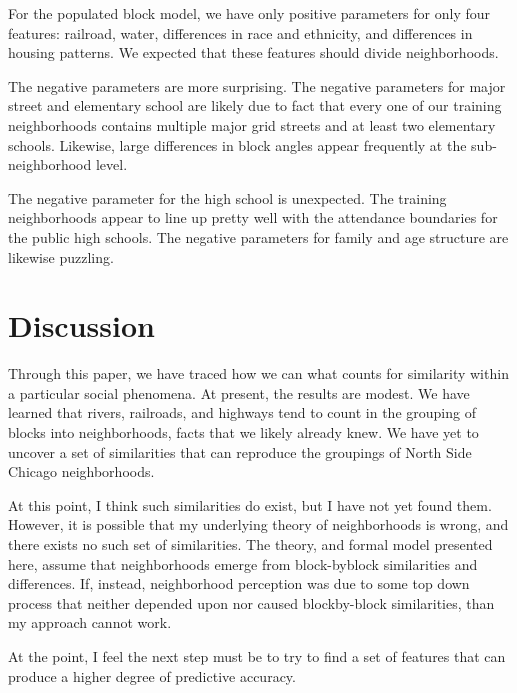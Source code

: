 \documentclass[12pt,letter]{article}\usepackage[]{graphicx}\usepackage[]{color}
\begin{document}
For the populated block model, we have only
positive parameters for only four features: railroad, water,
differences in race and ethnicity, and differences in housing
patterns. We expected that these features should divide neighborhoods.

The negative parameters are more surprising. The negative parameters
for major street and elementary school are likely due to fact that
every one of our training neighborhoods contains multiple major grid
streets and at least two elementary schools. Likewise, large
differences in block angles appear frequently at the sub-neighborhood
level.  

The negative parameter for the high school is unexpected. The
training neighborhoods appear to line up pretty well with the
attendance boundaries for the public high schools. The negative
parameters for family and age structure are likewise puzzling.

\section*{Discussion}
Through this paper, we have traced how we can what counts for similarity
within a particular social phenomena. At present, the results are modest.
We have learned that rivers, railroads, and highways tend to count in the
grouping of blocks into neighborhoods, facts that we likely already knew.
We have yet to uncover a set of similarities that can reproduce the groupings
of North Side Chicago neighborhoods.

At this point, I think such similarities do exist, but I have not yet
found them. However, it is possible that my underlying theory of
neighborhoods is wrong, and there exists no such set of
similarities. The theory, and formal model presented here, assume that
neighborhoods emerge from block-byblock similarities and
differences. If, instead, neighborhood perception was due to some top
down process that neither depended upon nor caused blockby-block
similarities, than my approach cannot work.  

At the point, I feel the
next step must be to try to find a set of features that can produce a
higher degree of predictive accuracy.


\end{document}
